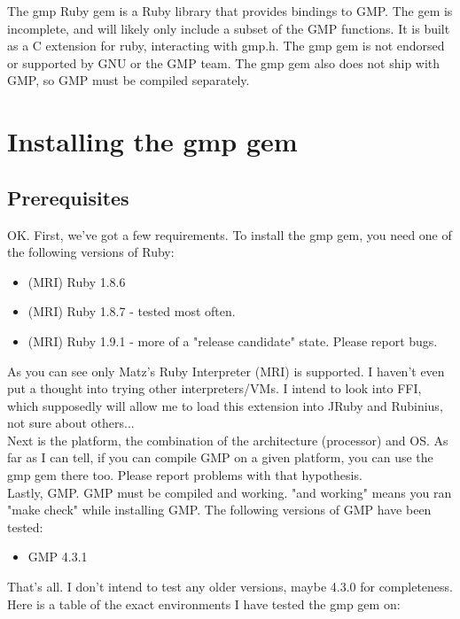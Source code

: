 \documentclass[pdftex,10pt]{article}
\begin{document}
The gmp Ruby gem is a Ruby library that provides bindings to GMP. The gem is
incomplete, and will likely only include a subset of the GMP functions. It is
built as a C extension for ruby, interacting with gmp.h. The gmp gem is not
endorsed or supported by GNU or the GMP team. The gmp gem also does not ship
with GMP, so GMP must be compiled separately.

\section{Installing the gmp gem}

\subsection{Prerequisites}
OK. First, we've got a few requirements. To install the gmp gem, you need one
of the following versions of Ruby:
\begin{itemize}
  \item (MRI) Ruby 1.8.6
  \item (MRI) Ruby 1.8.7 - tested most often.
  \item (MRI) Ruby 1.9.1 - more of a "release candidate" state. Please report
    bugs.
\end{itemize}
As you can see only Matz's Ruby Interpreter (MRI) is supported. I haven't even
put a thought into trying other interpreters/VMs. I intend to look into FFI,
which supposedly will allow me to load this extension into JRuby and Rubinius,
not sure about others...\\

Next is the platform, the combination of the architecture (processor) and OS.
As far as I can tell, if you can compile GMP on a given platform, you can use
the gmp gem there too. Please report problems with that hypothesis.\\

Lastly, GMP. GMP must be compiled and working. "and working" means you ran "make check" while installing GMP. The following versions of GMP have been tested:
\begin{itemize}
  \item GMP 4.3.1
\end{itemize}

That's all. I don't intend to test any older versions, maybe 4.3.0 for completeness.\\

Here is a table of the exact environments I have tested the gmp gem on:\\\\
\end{document}
